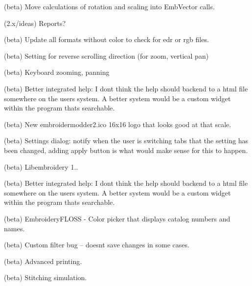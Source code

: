 \begin{DoxyRefList}
\label{todo__todo000372}%
%
(beta) Move calculations of rotation and scaling into {\ttfamily Emb\+Vector} calls.

\label{todo__todo000320}%
%
(2.\+x/ideas) Reports?

\label{todo__todo000374}%
%
(beta) Update all formats without color to check for edr or rgb files.

\label{todo__todo000375}%
%
(beta) Setting for reverse scrolling direction (for zoom, vertical pan)

\label{todo__todo000376}%
%
(beta) Keyboard zooming, panning

\label{todo__todo000377}%
%
(beta) Better integrated help\+: I don\textquotesingle{}t think the help should backend to a html file somewhere on the user\textquotesingle{}s system. A better system would be a custom widget within the program that\textquotesingle{}s searchable.

\label{todo__todo000378}%
%
(beta) New embroidermodder2.\+ico 16x16 logo that looks good at that scale.

\label{todo__todo000379}%
%
(beta) Settings dialog\+: notify when the user is switching tabs that the setting has been changed, adding apply button is what would make sense for this to happen.

\label{todo__todo000380}%
%
(beta) Libembroidery 1..

\label{todo__todo000381}%
%
(beta) Better integrated help\+: I don\textquotesingle{}t think the help should backend to a html file somewhere on the user\textquotesingle{}s system. A better system would be a custom widget within the program that\textquotesingle{}s searchable.

\label{todo__todo000382}%
%
(beta) Embroidery\+FLOSS -\/ Color picker that displays catalog numbers and names.

\label{todo__todo000383}%
%
(beta) Custom filter bug -- doesn\textquotesingle{}t save changes in some cases.

\label{todo__todo000384}%
%
(beta) Advanced printing.

\label{todo__todo000385}%
%
(beta) Stitching simulation.


\end{DoxyRefList}
